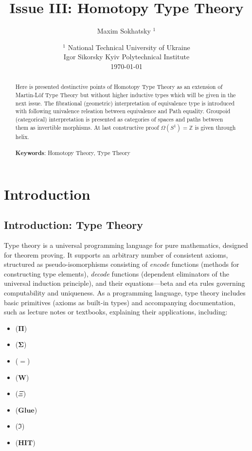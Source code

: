 \documentclass{article}
\begin{document}
\title{Issue III: Homotopy Type Theory}
\author{Maxim Sokhatsky $^1$}
\date{ $^1$ National Technical University of Ukraine \\
       \small Igor Sikorsky Kyiv Polytechnical Institute \\
       \today }

\maketitle

\begin{abstract}
Here is presented destinctive points of Homotopy Type Theory
as an extension of Martin-Löf Type Theory but without higher inductive types
which will be given in the next issue. The fibrational (geometric) interpretation
of equivalence type is introduced with following univalence releation
between equivalence and Path equality. Groupoid (categorical) interpretation
is presented as categories of spaces and paths between them as invertible morphisms.
At last constructive proof $\Omega(S^1)=\mathbb{Z}$ is given through helix.
\\
\\
{\bf Keywords}: Homotopy Theory, Type Theory
\end{abstract}

\newpage
\tableofcontents

\newpage
\section{Introduction}
\subsection{Introduction: Type Theory}
Type theory is a universal programming language for pure mathematics,
designed for theorem proving. It supports an arbitrary number of consistent
axioms, structured as pseudo-isomorphisms consisting of \textit{encode}
functions (methods for constructing type elements), \textit{decode}
functions (dependent eliminators of the universal induction principle),
and their equations---beta and eta rules governing computability and
uniqueness. As a programming language, type theory includes basic
primitives (axioms as built-in types) and accompanying documentation,
such as lecture notes or textbooks, explaining their applications, including:

\begin{itemize}
\item {} ($\mathbf{\Pi}$)
\item {} ($\mathbf{\Sigma}$)
\item {} ($\mathbf{=}$)
\item {} ($\mathbf{W}$)
\item {} ($\Xi$)
\item {} ($\mathbf{Glue}$)
\item {} ($\Im$)
\item {} ($\mathbf{HIT}$)
\end{itemize}
\end{document}

